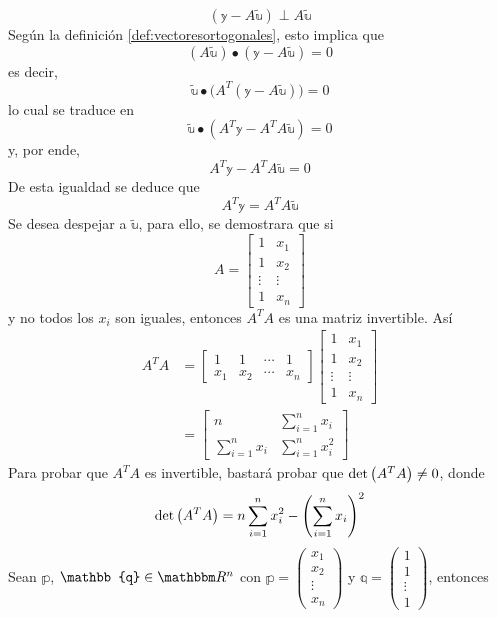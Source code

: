 $$(\mathbb{y} - A \tilde{\mathbb{u}}) \perp A\tilde{\mathbb{u}}$$
Según la definición \ref{def:vectoresortogonales}, esto implica que
$$(A\tilde{\mathbb{u}}) \bullet (\mathbb{y} - A\tilde{\mathbb{u}}) = 0$$
es decir,
$$\tilde{\mathbb{u}} \bullet \big( A^T (\mathbb{y} - A\tilde{\mathbb{u}}) \big) = 0$$
lo cual se traduce en
$$\tilde{\mathbb{u}} \bullet \left( A^T\mathbb{y} - A^TA\tilde{\mathbb{u}} \right) = 0$$
y, por ende,
$$A^T\mathbb{y} - A^TA\tilde{\mathbb{u}} = 0$$
De esta igualdad se deduce que
\begin{equation}
    A^T\mathbb{y} = A^TA\tilde{\mathbb{u}} \label{OPAOPAOPAIPAIPA}
\end{equation}
Se desea despejar a $\tilde{\mathbb{u}}$, para ello, se demostrara que si
$$A = \begin{bmatrix}
    1 & x_1 \\
    1 & x_2 \\
    \vdots & \vdots \\
    1 & x_n
\end{bmatrix}$$
y no todos los $x_i$ son iguales, entonces $A^TA$ es una matriz invertible. Así
\begin{align*}
    A^TA & = \begin{bmatrix}
        1 & 1 & \cdots & 1 \\
        x_1 & x_2 & \cdots & x_n
    \end{bmatrix} \begin{bmatrix}
        1 & x_1 \\
        1 & x_2 \\
        \vdots & \vdots \\
        1 & x_n
    \end{bmatrix} \\
    & = \begin{bmatrix}
        n & \displaystyle\sum_{i=1}^{n} x_i \\
        \displaystyle\sum_{i=1}^{n} x_i & \displaystyle\sum_{i=1}^{n}x_i^2
    \end{bmatrix}
\end{align*}
Para probar que $A^TA$ es invertible, bastará probar que $\operatorname{det} \left(A^T A \right) \neq 0$, donde
$$\operatorname{det} \left(A^T A\right) = n \sum_{i=1}^{n} x_i^2 - \left( \sum_{i=1}^{n} x_i \right)^2$$
Sean $\mathbb{p}$, $\mathbb{q} \in \RR[n]$ con $ \mathbb{p} = \begin{pmatrix} x_1 \\ x_2 \\ \vdots \\ x_n \end{pmatrix}$ y $\mathbb{q} = \begin{pmatrix} 1 \\ 1 \\ \vdots \\ 1 \end{pmatrix}$, entonces
